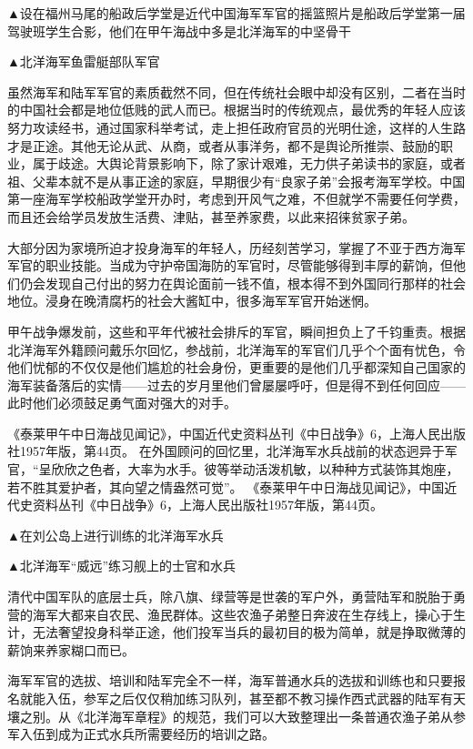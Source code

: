 \documentclass[12pt,UTF8]{ctexbook}
\begin{document}
▲设在福州马尾的船政后学堂是近代中国海军军官的摇篮照片是船政后学堂第一届驾驶班学生合影，他们在甲午海战中多是北洋海军的中坚骨干


▲北洋海军鱼雷艇部队军官

虽然海军和陆军军官的素质截然不同，但在传统社会眼中却没有区别，二者在当时的中国社会都是地位低贱的武人而已。根据当时的传统观点，最优秀的年轻人应该努力攻读经书，通过国家科举考试，走上担任政府官员的光明仕途，这样的人生路才是正途。其他无论从武、从商，或者从事洋务，都不是舆论所推崇、鼓励的职业，属于歧途。大舆论背景影响下，除了家计艰难，无力供子弟读书的家庭，或者祖、父辈本就不是从事正途的家庭，早期很少有“良家子弟”会报考海军学校。中国第一座海军学校船政学堂开办时，考虑到开风气之难，不但就学不需要任何学费，而且还会给学员发放生活费、津贴，甚至养家费，以此来招徕贫家子弟。

大部分因为家境所迫才投身海军的年轻人，历经刻苦学习，掌握了不亚于西方海军军官的职业技能。当成为守护帝国海防的军官时，尽管能够得到丰厚的薪饷，但他们仍会发现自己付出的努力在舆论面前一钱不值，根本得不到外国同行那样的社会地位。浸身在晚清腐朽的社会大酱缸中，很多海军军官开始迷惘。

甲午战争爆发前，这些和平年代被社会排斥的军官，瞬间担负上了千钧重责。根据北洋海军外籍顾问戴乐尔回忆，参战前，北洋海军的军官们几乎个个面有忧色，令他们忧郁的不仅仅是他们尴尬的社会身份，更重要的是他们几乎都深知自己国家的海军装备落后的实情——过去的岁月里他们曾屡屡呼吁，但是得不到任何回应——此时他们必须鼓足勇气面对强大的对手。

《泰莱甲午中日海战见闻记》，中国近代史资料丛刊《中日战争》6，上海人民出版社1957年版，第44页。
在外国顾问的回忆里，北洋海军水兵战前的状态迥异于军官，“呈欣欣之色者，大率为水手。彼等举动活泼机敏，以种种方式装饰其炮座，若不胜其爱护者，其向望之情盎然可觉”。 《泰莱甲午中日海战见闻记》，中国近代史资料丛刊《中日战争》6，上海人民出版社1957年版，第44页。


▲在刘公岛上进行训练的北洋海军水兵


▲北洋海军“威远”练习舰上的士官和水兵

清代中国军队的底层士兵，除八旗、绿营等是世袭的军户外，勇营陆军和脱胎于勇营的海军大都来自农民、渔民群体。这些农渔子弟整日奔波在生存线上，操心于生计，无法奢望投身科举正途，他们投军当兵的最初目的极为简单，就是挣取微薄的薪饷来养家糊口而已。

海军军官的选拔、培训和陆军完全不一样，海军普通水兵的选拔和训练也和只要报名就能入伍，参军之后仅仅稍加练习队列，甚至都不教习操作西式武器的陆军有天壤之别。从《北洋海军章程》的规范，我们可以大致整理出一条普通农渔子弟从参军入伍到成为正式水兵所需要经历的培训之路。
\end{document}
